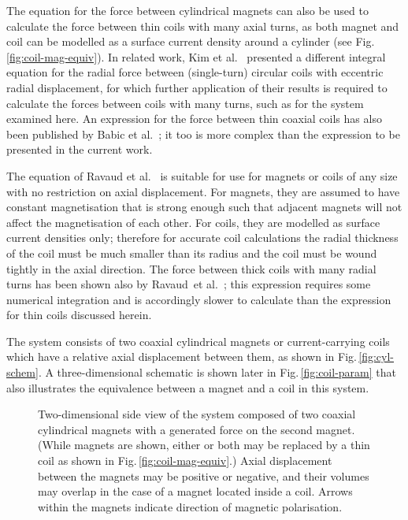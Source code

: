 \documentclass[11pt,a4paper]{memoir}
\begin{document}
The equation for the force between cylindrical magnets can also be used to calculate the force between thin coils with many axial turns, as both magnet and coil can be modelled as a surface current density around a cylinder (see Fig.\,\ref{fig:coil-mag-equiv}). In related work, Kim et al.~\cite{kim1996-ietm} presented a different integral equation for the radial force between (single-turn) circular coils with eccentric radial displacement, for which further application of their results is required to calculate the forces between coils with many turns, such as for the system examined here. An expression for the force between thin coaxial coils has also been published by Babic et al.~\cite{babic2008-ietm}; it too is more complex than the expression to be presented in the current work.

The equation of Ravaud et al.~\cite{ravaud2010-ietm} is suitable for use for magnets or coils of any size with no restriction on axial displacement. For magnets, they are assumed to have constant magnetisation that is strong enough such that adjacent magnets will not affect the magnetisation of each other. For coils, they are modelled as surface current densities only; therefore for accurate coil calculations the radial thickness of the coil must be much smaller than its radius and the coil must be wound tightly in the axial direction. The force between thick coils with many radial turns has been shown also by Ravaud~et al.~\cite{ravaud2010-pier}; this expression requires some numerical integration and is accordingly slower to calculate than the expression for thin coils discussed herein.

The system consists of two coaxial cylindrical magnets or current-carrying coils which have a relative axial displacement between them, as shown in Fig.\,\ref{fig:cyl-schem}.
A three-dimensional schematic is shown later in Fig.\,\ref{fig:coil-param} that also illustrates the equivalence between a magnet and a coil in this system.

\begin{figure}
\centering
{}
\caption{Two-dimensional side view of the system composed of two coaxial cylindrical magnets with a generated force on the second magnet. (While magnets are shown, either or both may be replaced by a thin coil as shown in Fig.\,\ref{fig:coil-mag-equiv}.) Axial displacement between the magnets may be positive or negative, and their volumes may overlap in the case of a magnet located inside a coil. Arrows within the magnets indicate direction of magnetic polarisation.}
\end{figure}
\end{document}
